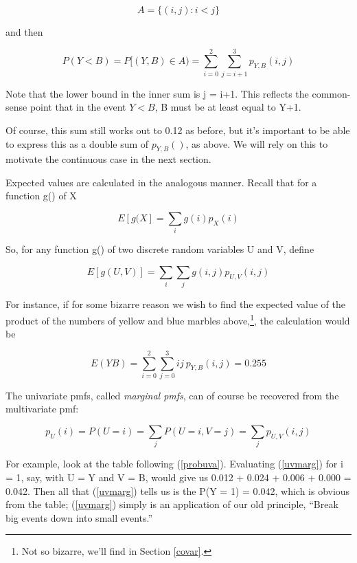 \begin{equation}
A = \{ (i,j): i < j \}
\end{equation}

and then

\begin{equation}
\label{probyltb}
P(Y < B) = 
P[(Y,B) \in A) =
\sum_{i=0}^2 
\sum_{j=i+1}^3
p_{Y,B}(i,j)
\end{equation}

Note that the lower bound in the inner sum is j = i+1.  This reflects
the common-sense point that in the event $Y < B$, B must be at least
equal to Y+1.

Of course, this sum still works out to 0.12 as before, but it's
important to be able to express this as a double sum of $p_{Y,B}()$, as
above.  We will rely on this to motivate the continuous case in the next
section.

Expected values are calculated in the analogous manner.  Recall that for
a function g() of X

\begin{equation}
E[g(X] = \sum_{i} g(i) p_{X}(i)
\end{equation}

So, for any function g() of two discrete random variables U and V,
define

\begin{equation}
E[g(U,V)] = 
\sum_i \sum_j g(i,j) p_{U,V}(i,j)
\end{equation}

For instance, if for some bizarre reason we wish to find the expected
value of the product of the numbers of yellow and blue marbles
above,\footnote{Not so bizarre, we'll find in Section \ref{covar}.}, the
calculation would be

\begin{equation}
E(YB) = \sum_{i=0}^2 \sum_{j=0}^{3} i j ~ p_{Y,B}(i,j)
= 0.255
\end{equation}

The univariate pmfs, called {\it marginal pmfs}, can of course be
recovered from the multivariate pmf:

\begin{equation}
\label{uvmarg}
p_U(i) = P(U = i) = \sum_{j} P(U = i, V = j) =
\sum_{j} p_{U,V}(i,j)
\end{equation}

For example, look at the table following (\ref{probuva}).  Evaluating
(\ref{uvmarg}) for i = 1, say, with U = Y and V = B, would give us
0.012 + 0.024 + 0.006 + 0.000 = 0.042.  Then all that (\ref{uvmarg})
tells us is the P(Y = 1) = 0.042, which is obvious from the table;
(\ref{uvmarg}) simply is an application of our old principle, ``Break
big events down into small events.''

